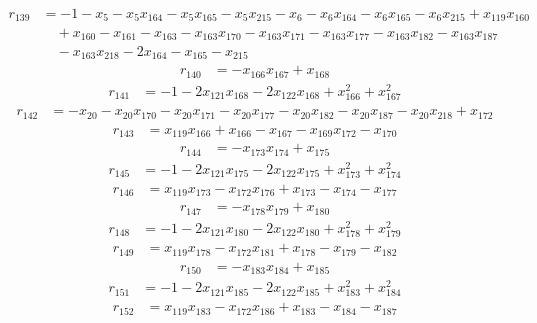 \begin{align*}
r_{139}&=
-1-x_{5}-x_{5}x_{164}-x_{5}x_{165}-x_{5}x_{215}-x_{6}-x_{6}x_{164}-x_{6}x_{165}-x_{6}x_{215}+x_{119}x_{160} \\
&\quad +x_{160}-x_{161}-x_{163}-x_{163}x_{170}-x_{163}x_{171}-x_{163}x_{177}-x_{163}x_{182}-x_{163}x_{187} \\
&\quad -x_{163}x_{218}-2x_{164}-x_{165}-x_{215}
\end{align*}
\begin{align*}
r_{140}&=
-x_{166}x_{167}+x_{168}
\end{align*}
\begin{align*}
r_{141}&=
-1-2x_{121}x_{168}-2x_{122}x_{168}+x_{166}^{2}+x_{167}^{2}
\end{align*}
\begin{align*}
r_{142}&=
-x_{20}-x_{20}x_{170}-x_{20}x_{171}-x_{20}x_{177}-x_{20}x_{182}-x_{20}x_{187}-x_{20}x_{218}+x_{172}
\end{align*}
\begin{align*}
r_{143}&=
x_{119}x_{166}+x_{166}-x_{167}-x_{169}x_{172}-x_{170}
\end{align*}
\begin{align*}
r_{144}&=
-x_{173}x_{174}+x_{175}
\end{align*}
\begin{align*}
r_{145}&=
-1-2x_{121}x_{175}-2x_{122}x_{175}+x_{173}^{2}+x_{174}^{2}
\end{align*}
\begin{align*}
r_{146}&=
x_{119}x_{173}-x_{172}x_{176}+x_{173}-x_{174}-x_{177}
\end{align*}
\begin{align*}
r_{147}&=
-x_{178}x_{179}+x_{180}
\end{align*}
\begin{align*}
r_{148}&=
-1-2x_{121}x_{180}-2x_{122}x_{180}+x_{178}^{2}+x_{179}^{2}
\end{align*}
\begin{align*}
r_{149}&=
x_{119}x_{178}-x_{172}x_{181}+x_{178}-x_{179}-x_{182}
\end{align*}
\begin{align*}
r_{150}&=
-x_{183}x_{184}+x_{185}
\end{align*}
\begin{align*}
r_{151}&=
-1-2x_{121}x_{185}-2x_{122}x_{185}+x_{183}^{2}+x_{184}^{2}
\end{align*}
\begin{align*}
r_{152}&=
x_{119}x_{183}-x_{172}x_{186}+x_{183}-x_{184}-x_{187}
\end{align*}
